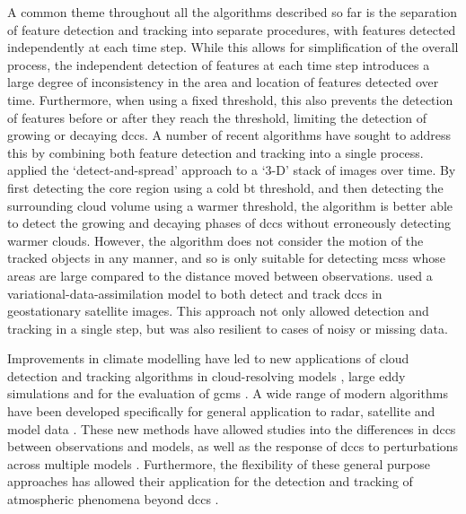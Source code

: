 A common theme throughout all the algorithms described so far is the separation of feature detection and tracking into separate procedures, with features detected independently at each time step.
While this allows for simplification of the overall process, the independent detection of features at each time step introduces a large degree of inconsistency in the area and location of features detected over time.
Furthermore, when using a fixed threshold, this also prevents the detection of features before or after they reach the threshold, limiting the detection of growing or decaying \acrshort{dcc}s.
A number of recent algorithms have sought to address this by combining both feature detection and tracking into a single process.
\citet{fiolleau_algorithm_2013} applied the `detect-and-spread' approach to a `3-D' stack of images over time.
By first detecting the core region using a cold \acrshort{bt} threshold, and then detecting the surrounding cloud volume using a warmer threshold, the algorithm is better able to detect the growing and decaying phases of \acrshort{dcc}s without erroneously detecting warmer clouds.
However, the algorithm does not consider the motion of the tracked objects in any manner, and so is only suitable for detecting \acrshort{mcs}s whose areas are large compared to the distance moved between observations.
\citet{thomas_data_2010} used a variational-data-assimilation model to both detect and track \acrshort{dcc}s in geostationary satellite images.
This approach not only allowed detection and tracking in a single step, but was also resilient to cases of noisy or missing data.

Improvements in climate modelling have led to new applications of cloud detection and tracking algorithms in cloud-resolving models \citep{plant_statistical_2009}, large eddy simulations \citep{dawe_statistical_2012a, heus_automated_2013} and for the evaluation of  \acrshort{gcm}s \citep{clark_application_2014}.
A wide range of modern algorithms have been developed specifically for general application to radar, satellite and model data \citep{heikenfeld_tobac_2019, ullrich_tempestextremes_2017, ullrich_tempestextremes_2021, raut_adaptive_2021, feng_pyflextrkr_2023}.
These new methods have allowed studies into the differences in \acrshort{dcc}s between observations and models, as well as the response of \acrshort{dcc}s to perturbations across multiple models \citep{marinescu_impacts_2021, feng_mesoscale_2023}.
Furthermore, the flexibility of these general purpose approaches has allowed their application for the detection and tracking of atmospheric phenomena beyond \acrshort{dcc}s \citep{bukowski_direct_2021, zhang_spaceborne_2023}.

